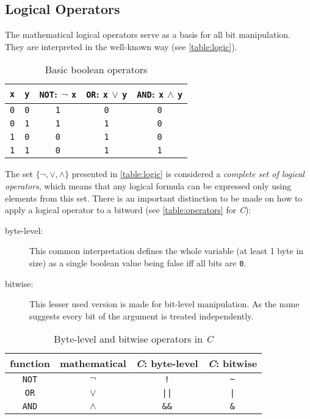 \subsection*{Logical Operators}
The mathematical logical operators serve as a basis
for all bit manipulation.
They are interpreted in the well-known way (see \autoref{table:logic}).

\begin{table}[H]
\centering
\begin{tabular}{c|c||c|c|c}
  \lstinline$x$ & \lstinline$y$
& \lstinline$NOT$: $\lnot$ \lstinline$x$
& \lstinline$OR$: \lstinline$x$ $\lor$ \lstinline$y$
& \lstinline$AND$: \lstinline$x$ $\land$ \lstinline$y$\\
\hline\hline
  \lstinline$0$ & \lstinline$0$
& \lstinline$1$ & \lstinline$0$ & \lstinline$0$\\
\hline
  \lstinline$0$ & \lstinline$1$
& \lstinline$1$ & \lstinline$1$ & \lstinline$0$\\
\hline
  \lstinline$1$ & \lstinline$0$
& \lstinline$0$ & \lstinline$1$ & \lstinline$0$\\
\hline
  \lstinline$1$ & \lstinline$1$
& \lstinline$0$ & \lstinline$1$ & \lstinline$1$\\
\end{tabular}
\caption{Basic boolean operators}
\label{table:logic}
\end{table}

The set $\{\lnot, \lor, \land\}$ presented in \autoref{table:logic}
is considered a \emph{complete set of logical operators},
which means that any logical formula can be expressed
only using elements from this set.
There is an important distinction to be made
on how to apply a logical operator to a bitword
(see \autoref{table:operators} for \emph{C}):

\begin{description}
\item[byte-level:] This common interpretation
defines the whole variable (at least 1 byte in size)
as a single boolean value being false iff all bits are \lstinline$0$.

\item[bitwise:] This lesser used version
is made for bit-level manipulation.
As the name suggests every bit of the argument is treated independently.

\end{description}

\begin{table}[H]
\centering
\begin{tabular}{c|c|c|c}
function & mathematical & \emph{C}: byte-level & \emph{C}: bitwise\\
\hline
\lstinline$NOT$ & $\lnot$ & \lstinline$!$ & \lstinline$~$\\
\lstinline$OR$ & $\lor$ & \lstinline$||$ & \lstinline$|$\\
\lstinline$AND$ & $\land$ & \lstinline$&&$ & \lstinline$&$\\
\end{tabular}
\caption{Byte-level and bitwise operators in \emph{C}}
\label{table:operators}
\end{table}


